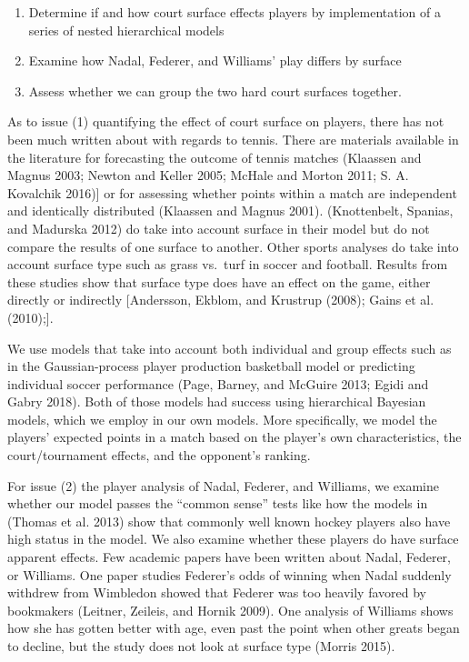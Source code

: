 \documentclass[]{article}
\begin{document}
\begin{enumerate}
\def\labelenumi{\arabic{enumi}.}
\item
  Determine if and how court surface effects players by implementation
  of a series of nested hierarchical models
\item
  Examine how Nadal, Federer, and Williams' play differs by surface
\item
  Assess whether we can group the two hard court surfaces together.
\end{enumerate}

As to issue (1) quantifying the effect of court surface on players,
there has not been much written about with regards to tennis. There are
materials available in the literature for forecasting the outcome of
tennis matches (Klaassen and Magnus 2003; Newton and Keller 2005; McHale
and Morton 2011; S. A. Kovalchik 2016){]} or for assessing whether
points within a match are independent and identically distributed
(Klaassen and Magnus 2001). (Knottenbelt, Spanias, and Madurska 2012) do
take into account surface in their model but do not compare the results
of one surface to another. Other sports analyses do take into account
surface type such as grass vs.~turf in soccer and football. Results from
these studies show that surface type does have an effect on the game,
either directly or indirectly {[}Andersson, Ekblom, and Krustrup (2008);
Gains et al. (2010);{]}.

We use models that take into account both individual and group effects
such as in the Gaussian-process player production basketball model or
predicting individual soccer performance (Page, Barney, and McGuire
2013; Egidi and Gabry 2018). Both of those models had success using
hierarchical Bayesian models, which we employ in our own models. More
specifically, we model the players' expected points in a match based on
the player's own characteristics, the court/tournament effects, and the
opponent's ranking.

For issue (2) the player analysis of Nadal, Federer, and Williams, we
examine whether our model passes the ``common sense'' tests like how the
models in (Thomas et al. 2013) show that commonly well known hockey
players also have high status in the model. We also examine whether
these players do have surface apparent effects. Few academic papers have
been written about Nadal, Federer, or Williams. One paper studies
Federer's odds of winning when Nadal suddenly withdrew from Wimbledon
showed that Federer was too heavily favored by bookmakers (Leitner,
Zeileis, and Hornik 2009). One analysis of Williams shows how she has
gotten better with age, even past the point when other greats began to
decline, but the study does not look at surface type (Morris 2015).
\end{document}
